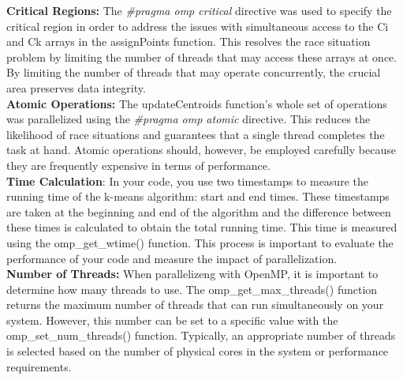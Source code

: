 \documentclass{article}
\begin{document}
\textbf{Critical Regions:} The \textit{\#pragma omp critical} directive was used to specify the critical region in order to address the issues with simultaneous access to the Ci and Ck arrays in the assignPoints function. This resolves the race situation problem by limiting the number of threads that may access these arrays at once. By limiting the number of threads that may operate concurrently, the crucial area preserves data integrity. \\

\textbf{Atomic Operations:} The updateCentroids function's whole set of operations was parallelized using the \textit{\#pragma omp atomic} directive. This reduces the likelihood of race situations and guarantees that a single thread completes the task at hand. Atomic operations should, however, be employed carefully because they are frequently expensive in terms of performance. \\

\textbf{Time Calculation}: In your code, you use two timestamps to measure the running time of the k-means algorithm: start and end times. These timestamps are taken at the beginning and end of the algorithm and the difference between these times is calculated to obtain the total running time. This time is measured using the omp\_get\_wtime() function. This process is important to evaluate the performance of your code and measure the impact of parallelization. \\

 \textbf{Number of Threads: }When parallelizeng with OpenMP, it is important to determine how many threads to use. The omp\_get\_max\_threads() function returns the maximum number of threads that can run simultaneously on your system. However, this number can be set to a specific value with the omp\_set\_num\_threads() function. Typically, an appropriate number of threads is selected based on the number of physical cores in the system or performance requirements.
\end{document}
